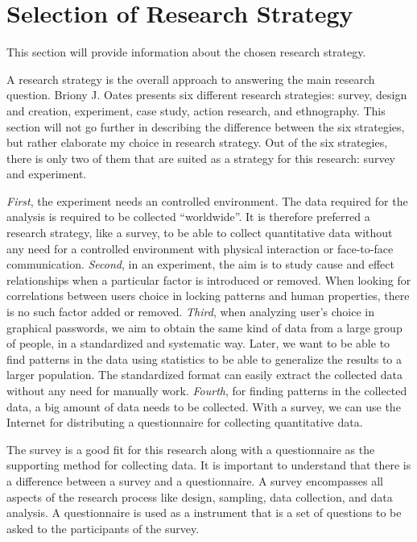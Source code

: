 \section{Selection of Research Strategy} \label{sec:researchstrategy}

  This section will provide information about the chosen research strategy.

  A research strategy is the overall approach to answering the main research question. Briony J. Oates \cite{empiriske} presents six different research strategies: survey, design and creation, experiment, case study, action research, and ethnography. This section will not go further in describing the difference between the six strategies, but rather elaborate my choice in research strategy. Out of the six strategies, there is only two of them that are suited as a strategy for this research: survey and experiment. 

  {\it First}, the experiment needs an controlled environment. The data required for the analysis is required to be collected ``worldwide''. It is therefore preferred a research strategy, like a survey, to be able to collect quantitative data without any need for a controlled environment with physical interaction or face-to-face communication.
  {\it Second}, in an experiment, the aim is to study cause and effect relationships when a particular factor is introduced or removed. When looking for correlations between users choice in locking patterns and human properties, there is no such factor added or removed.
  {\it Third}, when analyzing user's choice in graphical passwords, we aim to obtain the same kind of data from a large group of people, in a standardized and systematic way. Later, we want to be able to find patterns in the data using statistics to be able to generalize the results to a larger population. The standardized format can easily extract the collected data without any need for manually work.
  {\it Fourth}, for finding patterns in the collected data, a big amount of data needs to be collected. With a survey, we can use the Internet for distributing a questionnaire for collecting quantitative data. 

  The survey is a good fit for this research along with a questionnaire as the supporting method for collecting data. It is important to understand that there is a difference between a survey and a questionnaire. A survey encompasses all aspects of the research process like design, sampling, data collection, and data analysis. A questionnaire is used as a instrument that is a set of questions to be asked to the participants of the survey.

